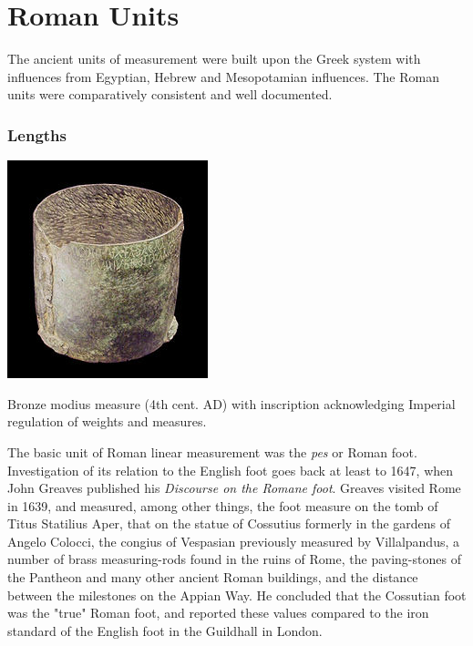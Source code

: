 \chapter{Roman Units}
The ancient units of measurement were built upon the Greek system with influences from Egyptian, Hebrew and Mesopotamian influences. The Roman units were
comparatively consistent and well documented.

\subsection{Lengths}

\begin{marginfigure}
\includegraphics[width=\linewidth]{./graphics/modius}
\caption{Bronze modius measure (4th cent. AD) with inscription acknowledging Imperial regulation of weights and measures.}
\end{marginfigure}


The basic unit of Roman linear measurement was the \textit{pes} or Roman foot. Investigation of its relation to the English foot goes back at least to 1647, when John Greaves published his \textit{Discourse on the Romane foot}. Greaves visited Rome in 1639, and measured, among other things, the foot measure on the tomb of Titus Statilius Aper, that on the statue of Cossutius formerly in the gardens of Angelo Colocci, the congius of Vespasian previously measured by Villalpandus, a number of brass measuring-rods found in the ruins of Rome, the paving-stones of the Pantheon and many other ancient Roman buildings, and the distance between the milestones on the Appian Way. He concluded that the Cossutian foot was the "true" Roman foot, and reported these values compared to the iron standard of the English foot in the Guildhall in London.



